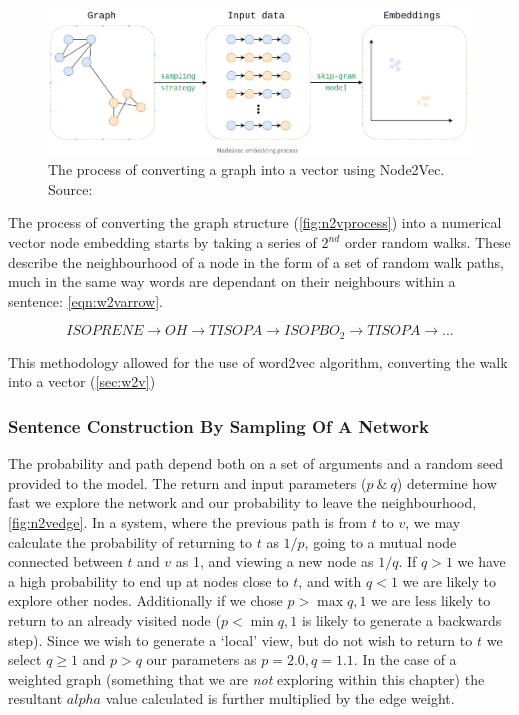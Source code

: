 \begin{figure}[H]
  \centering
\includegraphics[width=\textwidth]{4fig/n2vproc.png}
\caption{The process of converting a graph into a vector using Node2Vec. Source:\citep{n2vimg}}\label{fig:n2vprocess}
\end{figure}


The process of converting the graph structure (\autoref{fig:n2vprocess}) into a numerical vector node embedding starts by taking a series of $2^{nd}$ order random walks. These describe the neighbourhood of a node in the form of a set of random walk paths, much in the same way words are dependant on their neighbours within a sentence: \autoref{eqn:w2varrow}.


\begin{equation}
ISOPRENE \rightarrow OH \rightarrow TISOPA \rightarrow ISOPBO_2 \rightarrow TISOPA \rightarrow...
\label{eqn:w2varrow}
\end{equation}

This methodology allowed for the use of word2vec algorithm, converting the walk into a vector (\autoref{sec:w2v})



\subsubsection{Sentence Construction By Sampling Of A Network}
The probability and path depend both on a set of arguments and a random seed provided to the model. The return and input parameters ($p\ \&\ q$) determine how fast we explore the network and our probability to leave the neighbourhood, \autoref{fig:n2vedge}. In a system, where the previous path is from $t$ to $v$, we may calculate the probability of returning to $t$ as $1/p$, going to a mutual node connected between $t$ and $v$ as 1, and viewing a new node as $1/q$.
If $q>1$ we have a high probability to end up at nodes close to $t$, and with $q<1$ we are likely to explore other nodes. Additionally if we chose $p> \max{q,1}$ we are less likely to return to an already visited node ($p < \min{q,1}$ is likely to generate a backwards step). Since we wish to generate a `local' view, but do not wish to return to $t$ we select  $q \ge 1$ and $p > q$ our parameters as  $p = 2.0,q=1.1$.  In the case of a weighted graph (something that we are \textit{not} exploring within this chapter) the resultant $alpha$ value calculated is further multiplied by the edge weight.

